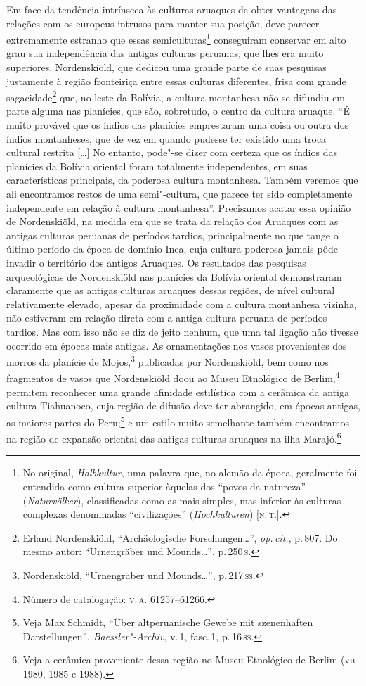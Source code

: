 Em face da tendência intrínseca às culturas aruaques de obter vantagens
das relações com os europeus intrusos para manter sua posição, deve
parecer extremamente estranho que essas semiculturas\footnote{No original,
  \textit{Halbkultur}, uma palavra que, no alemão da época, geralmente
  foi entendida como cultura superior àquelas dos ``povos da natureza''
  (\textit{Naturvölker}), classificadas como as mais simples, mas inferior
  às culturas complexas denominadas ``civilizações'' (\textit{Hochkulturen})
  {[}\textsc{n.\,t.}{]}.} conseguiram
conservar em alto grau sua independência das antigas culturas peruanas,
que lhes era muito superiores. Nordenskiöld, que dedicou uma grande
parte de suas pesquisas justamente à região fronteiriça entre essas
culturas diferentes, frisa com grande sagacidade\footnote{Erland Nordenskiöld, ``Archäologische Forschungen\ldots'', \textit{op.\,cit.}, p.\,807.
  Do mesmo autor: ``Urnengräber und Mounds\ldots'', p.\,250\,\textsc{s}.} que, no leste da Bolívia, a cultura
montanhesa não se difundiu em parte alguma nas planícies, que são,
sobretudo, o centro da cultura aruaque. ``É muito provável que os índios
das planícies emprestaram uma coisa ou outra dos índios montanheses,
que de vez em quando pudesse ter existido uma troca cultural restrita
{[}\ldots{}{]} No entanto, pode"-se dizer com certeza que os índios das
planícies da Bolívia oriental foram totalmente independentes, em suas
características principais, da poderosa cultura montanhesa. Também
veremos que ali encontramos restos de uma semi"-cultura, que parece ter
sido completamente independente em relação à cultura montanhesa''.
Precisamos acatar essa opinião de Nordenskiöld, na medida em que se
trata da relação dos Aruaques com as antigas culturas peruanas de
períodos tardios, principalmente no que tange o último período da época
de domínio Inca, cuja cultura poderosa jamais pôde invadir o território
dos antigos Aruaques. Os resultados das pesquisas arqueológicas de
Nordenskiöld nas planícies da Bolívia oriental demonstraram claramente
que as antigas culturas aruaques dessas regiões, de nível cultural
relativamente elevado, apesar da proximidade com a cultura montanhesa
vizinha, não estiveram em relação direta com a antiga cultura peruana de
períodos tardios. Mas com isso não se diz de jeito nenhum, que uma tal
ligação não tivesse ocorrido em épocas mais antigas. As ornamentações
nos vasos provenientes dos morros da planície de Mojos,\footnote{Nordenskiöld,
  ``Urnengräber und Mounds\ldots'', p.\,217\,\textsc{ss}.} 
  publicadas por Nordenskiöld, bem como nos fragmentos de
vasos que Nordenskiöld doou ao Museu Etnológico de Berlim,\footnote{Número
  de catalogação: \textsc{v.\,a.} 61257--61266.} permitem reconhecer uma grande
afinidade estilística com a cerâmica da antiga cultura Tiahuanoco, cuja
região de difusão deve ter abrangido, em épocas antigas, as maiores
partes do Peru;\footnote{Veja Max Schmidt, ``Über altperuanische Gewebe
  mit szenenhaften Darstellungen'', \textit{Baessler"-Archiv}, v.\,1, fasc.\,1, p.\,16\,\textsc{ss}.} e um estilo muito semelhante também encontramos na
região de expansão oriental das antigas culturas aruaques na ilha
Marajó.\footnote{Veja a cerâmica proveniente dessa região no Museu
  Etnológico de Berlim (\textsc{vb} 1980, 1985 e 1988).}

